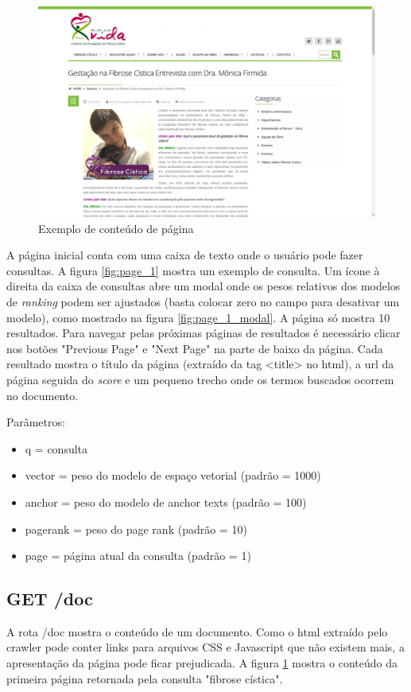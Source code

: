 \documentclass{article}
\begin{document}
\begin{figure}
\centering
\includegraphics[width=\linewidth]{doc.png}
\caption{Exemplo de conteúdo de página} 
\label{fig:doc}
\end{figure}

A página inicial conta com uma caixa de texto onde o usuário pode fazer consultas. A figura \ref{fig:page_1}
mostra um exemplo de consulta. 
Um ícone à direita da caixa de consultas abre um modal onde os pesos relativos dos modelos de \textit{ranking}
podem ser ajustados (basta colocar zero no campo para desativar um modelo), como mostrado na figura
\ref{fig:page_1_modal}. A página só mostra 
10 resultados. Para navegar pelas próximas páginas de resultados é necessário clicar nos botões
"Previous Page" e "Next Page" na parte de baixo da página.
Cada resultado mostra o título da página (extraído da tag <title> no html), a url da página 
seguida do \textit{score} e um pequeno trecho onde os termos buscados
ocorrem no documento.

Parâmetros: 
\begin{itemize}
  \item q = consulta
  \item vector = peso do modelo de espaço vetorial (padrão = 1000)
  \item anchor = peso do modelo de anchor texts (padrão = 100)
  \item pagerank = peso do page rank (padrão = 10)
  \item page = página atual da consulta (padrão = 1)
\end{itemize}

\subsection{GET /doc}
A rota /doc mostra o conteúdo de um documento. Como o html extraído pelo crawler pode conter links para
arquivos CSS e Javascript que não existem mais, a apresentação da página pode ficar prejudicada. A 
figura \ref{fig:doc} mostra o conteúdo da primeira página retornada pela consulta "fibrose cística". 
\end{document}
